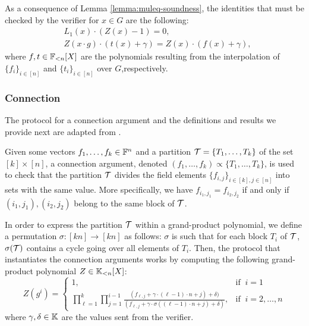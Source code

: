 As a consequence of Lemma \ref{lemma:muleq-soundness}, the identities that must be checked by the verifier for $x \in G$ are the following: 
\begin{align} \label{eq:permutation-Z}
&L_1(x) \cdot (Z(x) - 1) = 0, \\
&Z(x \cdot g) \cdot (t(x) + \gamma) = Z(x) \cdot (f(x) + \gamma),
\end{align}
where $f,t \in \mathbb{F}_{<n}[X]$ are the polynomials resulting from the interpolation of $\{f_i\}_{i\in[n]}$ and $\{t_i\}_{i\in[n]}$ over $G$,respectively.




\subsubsection*{Connection}

The protocol for a connection argument and the definitions and results we provide next are adapted from \cite{EPRINT:GabWilCio19}.

Given some vectors $f_1,\dots,f_k \in \mathbb{F}^n$ and a partition $\mathcal{T} = \{T_1,\dots,T_k\}$ of the set $[k] \times [n]$, a connection argument, denoted $(f_1,\dots,f_k) \propto \{T_1,\dots,T_k\}$, is used to check that the partition $\mathcal{T}$ divides the field elements $\{f_{i,j}\}_{i\in[k],j\in[n]}$ into sets with the same value. More specifically, we have $f_{i_1,j_1} = f_{i_2,j_2}$ if and only if $(i_1,j_1),(i_2,j_2)$ belong to the same block of $\mathcal{T}$. 

In order to express the partition $\mathcal{T}$ within a grand-product polynomial, we define a permutation $\sigma\colon [kn] \to [kn]$ as follows: $\sigma$ is such that for each block $T_i$ of $\mathcal{T}$, $\sigma(\mathcal{T})$ contains a cycle going over all elements of $T_i$. Then, the protocol that instantiates the connection arguments works by computing the following grand-product polynomial $Z \in \mathbb{K}_{<n}[X]$:
\[
  Z(g^i) = 
  \begin{cases} 
  1, & \text{if }~ i=1 \\ 
  \displaystyle\prod_{\ell=1}^{k}\prod_{j=1}^{i-1} \frac{(f_{\ell,j} + \gamma \cdot (\ell-1)\cdot n +j) + \delta)}{(f_{\ell,j} + \gamma \cdot \sigma((\ell-1)\cdot n +j) + \delta)}, & \text{if }~ i = 2, \dots, n
  \end{cases} 
\]
where $\gamma,\delta \in \mathbb{K}$ are the values sent from the verifier. 


